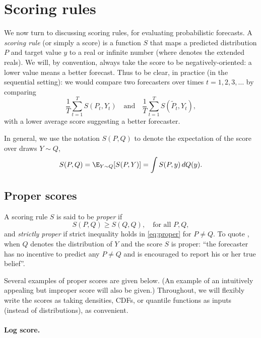 \documentclass{article}
\begin{document}
\section{Scoring rules}

We now turn to discussing scoring rules, for evaluating probabilistic
forecasts. A \emph{scoring rule} (or simply a score) is a function $S$ that maps
a predicted distribution $P$ and target value $y$ to a real or infinite number 
 (where \smash{$\widebar\R = \R \cup \{\pm 
  \infty\}$} denotes the extended reals). We will, by convention, always take
the score to be negatively-oriented: a lower value means a better forecast.    
Thus to be clear, in practice (in the sequential setting): we would compare two 
forecasters  over times $t=1,2,3,\dots$ by comparing    
\[
\frac{1}{T} \sum_{t=1}^T S(P_t, Y_t) \quad \text{and} \quad
\frac{1}{T} \sum_{t=1}^T S(\tilde{P}_t, Y_t),
\]
with a lower average score suggesting a better forecaster.

In general, we use the notation $S(P, Q)$ to denote the expectation of the score
over draws $Y \sim Q$,  
\[
S(P, Q) = \E_{Y \sim Q} [S(P, Y)] = \int S(P, y) \, dQ(y).
\]

\subsection{Proper scores}

A scoring rule $S$ is said to be \emph{proper} if
\begin{equation}
\label{eq:proper}
S(P, Q) \geq S(Q, Q), \quad \text{for all $P,Q$},
\end{equation}
and \emph{strictly proper} if strict inequality holds in \eqref{eq:proper} for
$P \not= Q$. To quote \citet{gneiting2007strictly}, when $Q$ denotes the 
distribution of $Y$ and the score $S$ is proper: ``the forecaster has no
incentive to predict any $P \not= Q$ and is encouraged to report his or her true
belief''.  

Several examples of proper scores are given below. (An example of an intuitively
appealing but improper score will also be given.) Throughout, we will flexibly
write the scores as taking densities, CDFs, or quantile functions as inputs
(instead of distributions), as convenient.        

\paragraph{Log score.}
\end{document}
